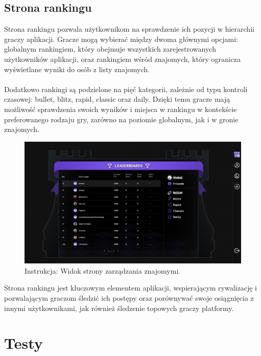 \documentclass[12pt,a4paper]{article}
\begin{document}
\newpage

\subsection{Strona rankingu}

\noindent
Strona rankingu pozwala użytkownikom na sprawdzenie ich pozycji w hierarchii graczy aplikacji. Gracze mogą wybierać między dwoma głównymi opcjami: globalnym rankingiem, który obejmuje wszystkich zarejestrowanych użytkowników aplikacji, oraz rankingiem wśród znajomych, który ogranicza wyświetlane wyniki do osób z listy znajomych.
\\\\
Dodatkowo rankingi są podzielone na pięć kategorii, zależnie od typu kontroli czasowej: bullet, blitz, rapid, classic oraz daily. Dzięki temu gracze mają możliwość sprawdzenia swoich wyników i miejsca w rankingu w kontekście preferowanego rodzaju gry, zarówno na poziomie globalnym, jak i w gronie znajomych.

\vspace{0.5cm}
\begin{figure}[h!]
    \centering
    \includegraphics[width=1\textwidth]{images/ins_rank.png}
    \caption{Instrukcja: Widok strony zarządzania znajomymi.}
\end{figure}
\vspace{0.5cm}

\noindent
Strona rankingu jest kluczowym elementem aplikacji, wspierającym rywalizację i pozwalającym graczom śledzić ich postępy oraz porównywać swoje osiągnięcia z innymi użytkownikami, jak również śledzenie topowych graczy platformy.

\newpage

\section{Testy}
\end{document}
